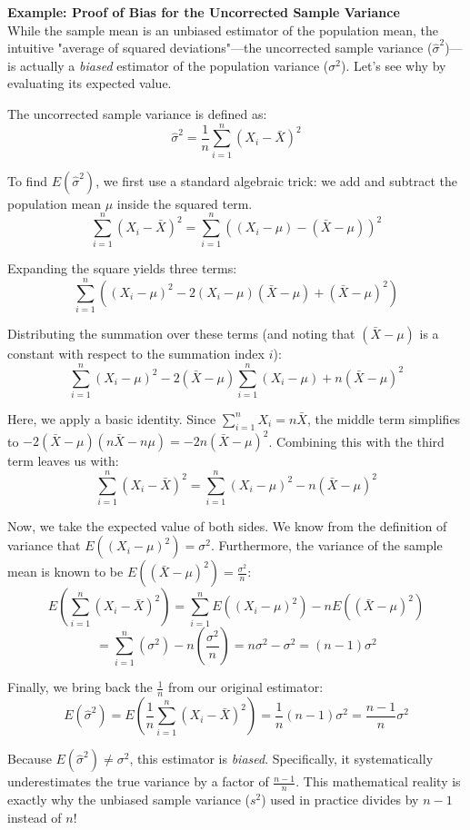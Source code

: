 \documentclass{article}
\begin{document}
\textbf{Example: Proof of Bias for the Uncorrected Sample Variance} \\
While the sample mean is an unbiased estimator of the population mean, the intuitive "average of squared deviations"—the uncorrected sample variance ($\hat{\sigma}^2$)—is actually a \emph{biased} estimator of the population variance ($\sigma^2$). Let's see why by evaluating its expected value. 

The uncorrected sample variance is defined as:
$$ \hat{\sigma}^2 = \frac{1}{n} \sum_{i=1}^{n} (X_i - \bar{X})^2 $$

To find $E(\hat{\sigma}^2)$, we first use a standard algebraic trick: we add and subtract the population mean $\mu$ inside the squared term.
$$ \sum_{i=1}^{n} (X_i - \bar{X})^2 = \sum_{i=1}^{n} ((X_i - \mu) - (\bar{X} - \mu))^2 $$

Expanding the square yields three terms:
$$ \sum_{i=1}^{n} ((X_i - \mu)^2 - 2(X_i - \mu)(\bar{X} - \mu) + (\bar{X} - \mu)^2) $$

Distributing the summation over these terms (and noting that $(\bar{X} - \mu)$ is a constant with respect to the summation index $i$):
$$ \sum_{i=1}^{n} (X_i - \mu)^2 - 2(\bar{X} - \mu) \sum_{i=1}^{n} (X_i - \mu) + n(\bar{X} - \mu)^2 $$

Here, we apply a basic identity. Since $\sum_{i=1}^{n} X_i = n\bar{X}$, the middle term simplifies to $-2(\bar{X} - \mu)(n\bar{X} - n\mu) = -2n(\bar{X} - \mu)^2$. Combining this with the third term leaves us with:
$$ \sum_{i=1}^{n} (X_i - \bar{X})^2 = \sum_{i=1}^{n} (X_i - \mu)^2 - n(\bar{X} - \mu)^2 $$

Now, we take the expected value of both sides. We know from the definition of variance that $E((X_i - \mu)^2) = \sigma^2$. Furthermore, the variance of the sample mean is known to be $E((\bar{X} - \mu)^2) = \frac{\sigma^2}{n}$:
$$ E\left( \sum_{i=1}^{n} (X_i - \bar{X})^2 \right) = \sum_{i=1}^{n} E((X_i - \mu)^2) - n E((\bar{X} - \mu)^2) $$
$$ = \sum_{i=1}^{n} (\sigma^2) - n \left( \frac{\sigma^2}{n} \right) = n\sigma^2 - \sigma^2 = (n - 1)\sigma^2 $$

Finally, we bring back the $\frac{1}{n}$ from our original estimator:
$$ E(\hat{\sigma}^2) = E\left( \frac{1}{n} \sum_{i=1}^{n} (X_i - \bar{X})^2 \right) = \frac{1}{n} (n - 1)\sigma^2 = \frac{n - 1}{n} \sigma^2 $$

Because $E(\hat{\sigma}^2) \neq \sigma^2$, this estimator is \emph{biased}. Specifically, it systematically underestimates the true variance by a factor of $\frac{n-1}{n}$. This mathematical reality is exactly why the unbiased sample variance ($s^2$) used in practice divides by $n - 1$ instead of $n$! 
\end{document}
